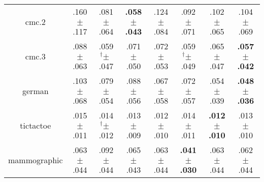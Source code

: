 \begin{tabular}{|c|ccccccc|}
cmc.2 & .160$^{\phantom{\dag}}\pm^{\phantom{\dag}}$.117\cellcolor{red!40} & .081$^{\phantom{\dag}}\pm^{\phantom{\dag}}$.064\cellcolor{green!21} & \textbf{.058$^{\phantom{\dag}}\pm^{\phantom{\dag}}$.043}\cellcolor{green!40} & .124$^{\phantom{\dag}}\pm^{\phantom{\dag}}$.084\cellcolor{red!11} & .092$^{\phantom{\dag}}\pm^{\phantom{\dag}}$.071\cellcolor{green!13} & .102$^{\phantom{\dag}}\pm^{\phantom{\dag}}$.065\cellcolor{green!5} & .104$^{\phantom{\dag}}\pm^{\phantom{\dag}}$.069\cellcolor{green!4} \\
cmc.3 & .088$^{\phantom{\dag}}\pm^{\phantom{\dag}}$.063\cellcolor{red!40} & .059$^{\dag}\pm^{\phantom{\dag}}$.047\cellcolor{green!34} & .071$^{\phantom{\dag}}\pm^{\phantom{\dag}}$.050\cellcolor{green!3} & .072$^{\phantom{\dag}}\pm^{\phantom{\dag}}$.053\cellcolor{green!0} & .059$^{\dag}\pm^{\phantom{\dag}}$.049\cellcolor{green!33} & .065$^{\phantom{\dag}}\pm^{\phantom{\dag}}$.047\cellcolor{green!19} & \textbf{.057$^{\phantom{\dag}}\pm^{\phantom{\dag}}$.042}\cellcolor{green!40} \\
german & .103$^{\phantom{\dag}}\pm^{\phantom{\dag}}$.068\cellcolor{red!40} & .079$^{\phantom{\dag}}\pm^{\phantom{\dag}}$.054\cellcolor{red!4} & .088$^{\phantom{\dag}}\pm^{\phantom{\dag}}$.056\cellcolor{red!17} & .067$^{\phantom{\dag}}\pm^{\phantom{\dag}}$.058\cellcolor{green!13} & .072$^{\phantom{\dag}}\pm^{\phantom{\dag}}$.057\cellcolor{green!5} & .054$^{\phantom{\dag}}\pm^{\phantom{\dag}}$.039\cellcolor{green!32} & \textbf{.048$^{\phantom{\dag}}\pm^{\phantom{\dag}}$.036}\cellcolor{green!40} \\
tictactoe & .015$^{\phantom{\dag}}\pm^{\phantom{\dag}}$.011\cellcolor{red!40} & .014$^{\dag}\pm^{\phantom{\dag}}$.012\cellcolor{red!6} & .013$^{\phantom{\dag}}\pm^{\phantom{\dag}}$.009\cellcolor{green!15} & .012$^{\phantom{\dag}}\pm^{\phantom{\dag}}$.010\cellcolor{green!39} & .014$^{\phantom{\dag}}\pm^{\phantom{\dag}}$.011\cellcolor{red!22} & \textbf{.012$^{\phantom{\dag}}\pm^{\phantom{\dag}}$.010}\cellcolor{green!40} & .013$^{\phantom{\dag}}\pm^{\phantom{\dag}}$.010\cellcolor{green!27} \\
mammographic & .063$^{\phantom{\dag}}\pm^{\phantom{\dag}}$.044\cellcolor{green!6} & .092$^{\phantom{\dag}}\pm^{\phantom{\dag}}$.044\cellcolor{red!40} & .065$^{\phantom{\dag}}\pm^{\phantom{\dag}}$.043\cellcolor{green!3} & .063$^{\phantom{\dag}}\pm^{\phantom{\dag}}$.044\cellcolor{green!6} & \textbf{.041$^{\phantom{\dag}}\pm^{\phantom{\dag}}$.030}\cellcolor{green!40} & .063$^{\phantom{\dag}}\pm^{\phantom{\dag}}$.044\cellcolor{green!5} & .062$^{\phantom{\dag}}\pm^{\phantom{\dag}}$.044\cellcolor{green!6} \\

\end{tabular}
